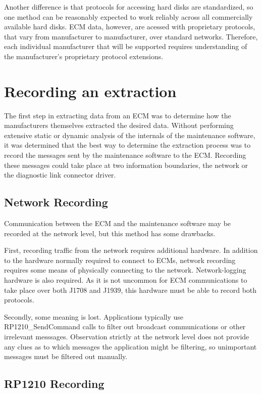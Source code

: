 Another difference is that protocols for accessing hard disks are standardized, so one method can be reasonably expected
to work reliably across all commercially available hard disks. ECM data, however, are acessed with proprietary protocols,
that vary from manufacturer to manufacturer, over standard networks. 
Therefore, each individual manufacturer that will be supported requires understanding of the  manufacturer's proprietary protocol extensions.

\section{Recording an extraction}

The first step in extracting data from an ECM was to determine how the manufacturers themselves extracted
the desired data. Without performing extensive static or dynamic analysis of the internals of the maintenance
software, it was determined that the best way to determine the extraction process was to record the messages
sent by the maintenance software to the ECM. Recording these messages could take place at two information boundaries,
the network or the diagnostic link connector driver.

\subsection{Network Recording}

Communication between the ECM and the maintenance software may be recorded at the network level, but this method
has some drawbacks.

First, recording traffic from the network requires additional hardware. In addition to the hardware normally required
to connect to ECMs, network recording requires some means of physically connecting to the network. Network-logging
hardware is also required. As it is not uncommon for ECM communications to take place over both J1708 and J1939, 
this hardware must be able to record both protocols.

Secondly, some meaning is lost. Applications typically use RP1210\_SendCommand calls to filter out broadcast communications
or other irrelevant messsages. Observation strictly at the network level does not provide any clues as to which messages
the application might be filtering, so unimportant messages must be filtered out manually.

\subsection{RP1210 Recording}

